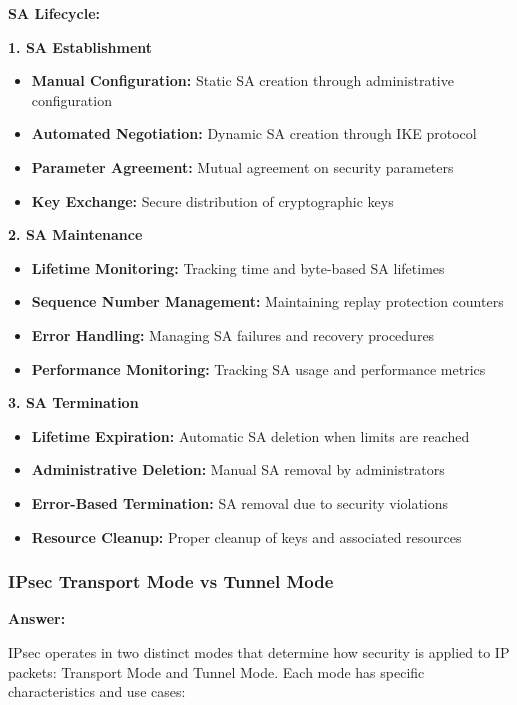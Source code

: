 \documentclass[12pt,a4paper]{article}
\begin{document}
\textbf{SA Lifecycle:}

\textbf{1. SA Establishment}
\begin{itemize}
    \item \textbf{Manual Configuration:} Static SA creation through administrative configuration
    \item \textbf{Automated Negotiation:} Dynamic SA creation through IKE protocol
    \item \textbf{Parameter Agreement:} Mutual agreement on security parameters
    \item \textbf{Key Exchange:} Secure distribution of cryptographic keys
\end{itemize}

\textbf{2. SA Maintenance}
\begin{itemize}
    \item \textbf{Lifetime Monitoring:} Tracking time and byte-based SA lifetimes
    \item \textbf{Sequence Number Management:} Maintaining replay protection counters
    \item \textbf{Error Handling:} Managing SA failures and recovery procedures
    \item \textbf{Performance Monitoring:} Tracking SA usage and performance metrics
\end{itemize}

\textbf{3. SA Termination}
\begin{itemize}
    \item \textbf{Lifetime Expiration:} Automatic SA deletion when limits are reached
    \item \textbf{Administrative Deletion:} Manual SA removal by administrators
    \item \textbf{Error-Based Termination:} SA removal due to security violations
    \item \textbf{Resource Cleanup:} Proper cleanup of keys and associated resources
\end{itemize}

\subsubsection{IPsec Transport Mode vs Tunnel Mode}

\textbf{Answer:}

IPsec operates in two distinct modes that determine how security is applied to IP packets: Transport Mode and Tunnel Mode. Each mode has specific characteristics and use cases:
\end{document}

